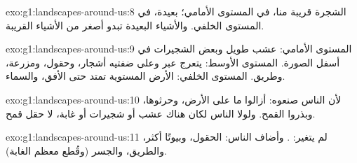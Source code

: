 \begin{solution}{exo:g1:landscapes-around-us:8}
الشجرة قريبة منا، في المستوى الأمامي؛  بعيدة، في المستوى الخلفي.
والأشياء البعيدة تبدو أصغر من الأشياء
القريبة.
\end{solution}

\begin{solution}{exo:g1:landscapes-around-us:9}
المستوى الأمامي: عشب طويل وبعض الشجيرات في أسفل الصورة.
المستوى الأوسط:  يتعرج عبر  وعلى ضفتيه أشجار، وحقول، ومزرعة،
وطريق.
المستوى الخلفي: الأرض المستوية تمتد حتى الأفق، والسماء.
\end{solution}

\begin{solution}{exo:g1:landscapes-around-us:10}
لأن الناس صنعوه: أزالوا ما على الأرض، وحرثوها، وبذروا القمح. ولولا
الناس لكان هناك عشب أو شجيرات أو غابة، لا حقل قمح.
\end{solution}

\begin{solution}{exo:g1:landscapes-around-us:11}
لم يتغير:  . وأضاف الناس: الحقول، وبيوتًا أكثر، والطريق،
والجسر (وقُطع معظم الغابة).
\end{solution}
